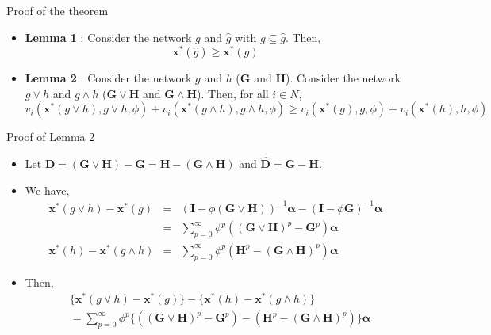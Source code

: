 \documentclass[10pt,dvipdfmx]{beamer}
\begin{document}
\begin{frame}[label=proof]{Proof of the theorem}
\begin{itemize}
    \item {\bf{Lemma 1}} : Consider the network $g$ and $\hat{g}$ with $g \subseteq \hat{g}$. Then,
            \[ \bm{x}^*(\hat{g}) \ge \bm{x}^*(g) \]
    \item {\bf{Lemma 2}} : Consider the network $g$ and $h$ ($\bm{G}$ and $\bm{H}$). Consider the network $g \vee h$ and $g \wedge h$ ($\bm{G} \vee \bm{H}$ and $\bm{G} \wedge \bm{H}$).  Then, for all $i \in N$,
        {\small{
            \[ v_i(\bm{x}^*(g \vee h), g \vee h, \phi) + v_i(\bm{x}^*(g \wedge h), g \wedge h, \phi) \ge v_i(\bm{x}^*(g), g, \phi) + v_i(\bm{x}^*(h), h, \phi)\]
        }}
\end{itemize}
\end{frame}

\begin{frame}{Proof of Lemma 2}
\begin{itemize}
    \item Let $\bm{D} = (\bm{G} \vee \bm{H}) - \bm{G} = \bm{H} - (\bm{G} \wedge \bm{H})$ and $\bm{\hat{D}} = \bm{G} - \bm{H}$.
    \item We have,
        \begin{eqnarray*}
            \bm{x}^*(g \vee h) - \bm{x}^*(g) &=& {(\bm{I} - \phi (\bm{G} \vee \bm{H}))}^{-1} \bm{\alpha} - {(\bm{I} - \phi \bm{G})}^{-1} \bm{\alpha} \\
                                            &=& \sum_{p=0}^{\infty} \phi^p ((\bm{G} \vee \bm{H})^p - \bm{G}^p) \bm{\alpha} \\
            \bm{x}^*(h) - \bm{x}^*(g \wedge h) &=& \sum_{p=0}^{\infty} \phi^p (\bm{H}^p - (\bm{G} \wedge \bm{H})^p) \bm{\alpha}
        \end{eqnarray*}
    \item Then,
        \begin{align*}
            & \{ \bm{x}^*(g \vee h) - \bm{x}^*(g) \} - \{ \bm{x}^*(h) - \bm{x}^*(g \wedge h) \} \\
                & = \sum_{p=0}^{\infty} \phi^p \{((\bm{G} \vee \bm{H})^p - \bm{G}^p) - (\bm{H}^p - (\bm{G} \wedge \bm{H})^p)\} \bm{\alpha}
        \end{align*}
\end{itemize}
\end{frame}
\end{document}
